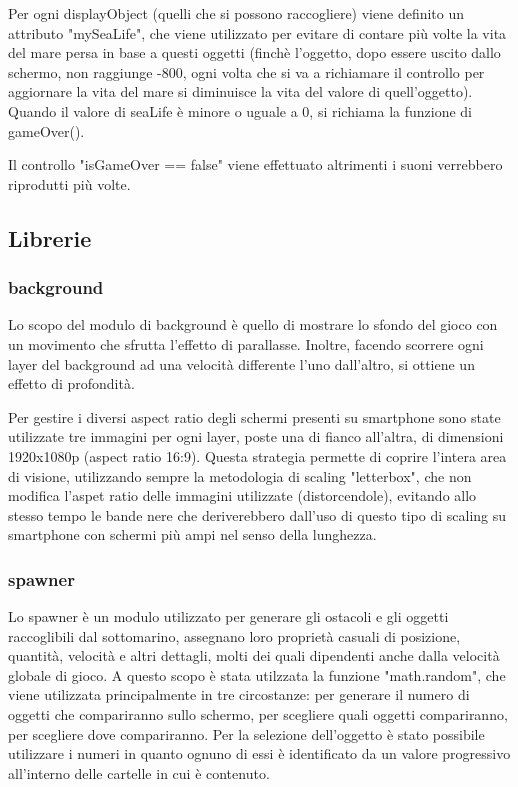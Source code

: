 \documentclass[12pt]{article}
\begin{document}
Per ogni displayObject (quelli che si possono raccogliere) viene definito un attributo "mySeaLife", che viene utilizzato per evitare di contare più volte la vita del mare persa in base a questi oggetti (finchè l'oggetto, dopo essere uscito dallo schermo, non raggiunge -800, ogni volta che si va a richiamare il controllo per aggiornare la vita del mare si diminuisce la vita del valore di quell'oggetto). Quando il valore di seaLife è minore o uguale a 0, si richiama la funzione di gameOver().

Il controllo "isGameOver == false" viene effettuato altrimenti i suoni verrebbero riprodutti più volte.

\subsection{Librerie}
\subsubsection{background}
Lo scopo del modulo di background è quello di mostrare lo sfondo del gioco con un movimento che sfrutta l'effetto di parallasse. Inoltre, facendo scorrere ogni layer del background ad una velocità differente l'uno dall'altro, si ottiene un effetto di profondità.

Per gestire i diversi aspect ratio degli schermi presenti su smartphone sono state utilizzate tre immagini per ogni layer, poste una di fianco all'altra, di dimensioni 1920x1080p (aspect ratio 16:9). Questa strategia permette di coprire l'intera area di visione, utilizzando sempre la metodologia di scaling "letterbox", che non modifica l'aspet ratio delle immagini utilizzate (distorcendole), evitando allo stesso tempo le bande nere che deriverebbero dall'uso di questo tipo di scaling su smartphone con schermi più ampi nel senso della lunghezza.

\subsubsection{spawner}
Lo spawner è un modulo utilizzato per generare gli ostacoli e gli oggetti raccoglibili dal sottomarino, assegnano loro proprietà casuali di posizione, quantità, velocità e altri dettagli, molti dei quali dipendenti anche dalla velocità globale di gioco. A questo scopo è stata utilzzata la funzione "math.random", che viene utilizzata principalmente in tre circostanze: per generare il numero di oggetti che compariranno sullo schermo, per scegliere quali oggetti compariranno, per scegliere dove compariranno. Per la selezione dell’oggetto è stato possibile utilizzare i numeri in quanto ognuno di essi è identificato da un valore progressivo all'interno delle cartelle in cui è contenuto.
\end{document}
